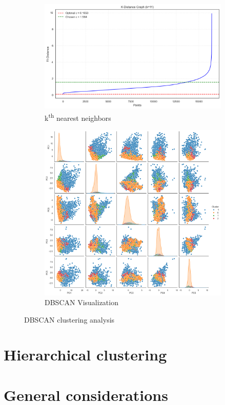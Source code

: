 \begin{figure}[h]
    \centering
    \begin{subfigure}[b]{0.49\textwidth}
        \centering
        \includegraphics[width=\textwidth]{plots/DBSCAN_kth_graph.png}
        \caption{k\textsuperscript{th} nearest neighbors}
        \label{fig:DBSCAN_kth_graph}
    \end{subfigure}
    \begin{subfigure}[b]{0.49\textwidth}
        \centering
        \includegraphics[width=\textwidth]{plots/DBSCAN_provvisoria.png}
        \caption{DBSCAN Visualization}
        \label{fig:DBSCAN_provvisoria}
    \end{subfigure}
    \caption{DBSCAN clustering analysis}
    \label{fig:three_subplots}
\end{figure}




\section{Hierarchical clustering}\label{sec:hierarchical}


\section{General considerations}\label{sec:considerations}